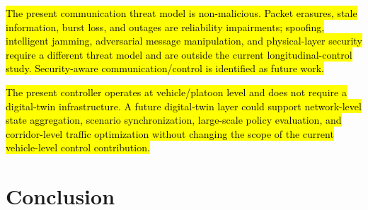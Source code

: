 \documentclass{ieeeaccess}
\begin{document}
\hl{The present communication threat model is non-malicious. Packet erasures, stale information, burst loss, and outages are reliability impairments; spoofing, intelligent jamming, adversarial message manipulation, and physical-layer security require a different threat model and are outside the current longitudinal-control study. Security-aware communication/control is identified as future work.}

\hl{The present controller operates at vehicle/platoon level and does not require a digital-twin infrastructure. A future digital-twin layer could support network-level state aggregation, scenario synchronization, large-scale policy evaluation, and corridor-level traffic optimization without changing the scope of the current vehicle-level control contribution.}

\section{Conclusion}
\label{sec:Conclusion}
\end{document}
